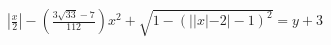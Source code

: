 \documentclass[preview]{standalone}
\begin{document}
\begin{align*}
\left|\frac{x}{2}\right| - \left(\frac{3\sqrt{33}-7}{112}\right)x^2 + \sqrt{1 - (||x|-2| - 1)^2} = y + 3
\end{align*}
\end{document}

